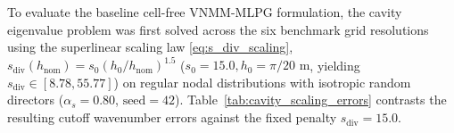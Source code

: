 \documentclass[preprint,12pt]{elsarticle}
\begin{document}
To evaluate the baseline cell-free VNMM-MLPG formulation, the cavity eigenvalue problem was first solved across the six benchmark grid resolutions using the superlinear scaling law \eqref{eq:s_div_scaling}, $s_{\mathrm{div}}(h_{\mathrm{nom}}) = s_0 (h_0 / h_{\mathrm{nom}})^{1.5}$ ($s_0 = 15.0, h_0 = \pi/20\text{ m}$, yielding $s_{\mathrm{div}} \in [8.78, 55.77]$) on regular nodal distributions with isotropic random directors ($\alpha_s = 0.80$, $\text{seed}=42$). Table~\ref{tab:cavity_scaling_errors} contrasts the resulting cutoff wavenumber errors against the fixed penalty $s_{\mathrm{div}} = 15.0$.

\begin{table}[!t]
    \centering
    \small
    \caption{Cavity eigenvalue cutoff wavenumber error comparison on the 2D PEC resonant cavity across the six grid resolutions from \cite{stable_vnmm2d_2026}: fixed penalty ($s_{\mathrm{div}} = 15.0$) vs. superlinear $h_{\mathrm{nom}}$-scaled penalty ($s_{\mathrm{div}}(h_{\mathrm{nom}}) = s_0(h_0/h_{\mathrm{nom}})^{1.5}$, $s_{\mathrm{div}} \in [8.78, 55.77]$) with isotropic random directors ($\alpha_s = 0.80$, $\text{seed}=42$).}
    \label{tab:cavity_scaling_errors}
\end{table}
\end{document}

